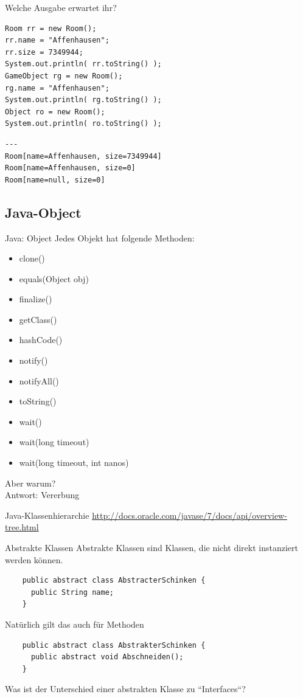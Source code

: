 \documentclass[18pt]{beamer}
\begin{document}
\begin{frame}[fragile]{Welche Ausgabe erwartet ihr?}
 \begin{lstlisting}
Room rr = new Room();
rr.name = "Affenhausen";
rr.size = 7349944;
System.out.println( rr.toString() );
GameObject rg = new Room();
rg.name = "Affenhausen";
System.out.println( rg.toString() );
Object ro = new Room();
System.out.println( ro.toString() );
 \end{lstlisting}
 \pause
 \begin{lstlisting}
---
Room[name=Affenhausen, size=7349944]
Room[name=Affenhausen, size=0]
Room[name=null, size=0]
\end{lstlisting}

\end{frame}

\subsection{Java-Object}
\begin{frame}{Java: Object}
  \small
 Jedes Objekt hat folgende Methoden:
 \begin{itemize}
  \item clone()
  \item equals(Object obj)
  \item finalize()
  \item getClass()
  \item hashCode()
  \item notify()
  \item notifyAll()
  \item toString()
  \item wait()
  \item wait(long timeout)
  \item wait(long timeout, int nanos)
 \end{itemize} \pause
 Aber warum? \pause \\
 \large Antwort: Vererbung
 

\end{frame}
\begin{frame}{Java-Klassenhierarchie}
 \url{http://docs.oracle.com/javase/7/docs/api/overview-tree.html}
\end{frame}

\begin{frame}[fragile]{Abstrakte Klassen}
 Abstrakte Klassen sind Klassen, die nicht direkt instanziert werden können.
 \begin{lstlisting}
    public abstract class AbstracterSchinken {
      public String name;
    }
 \end{lstlisting} \pause
 Natürlich gilt das auch für Methoden
 \begin{lstlisting}
    public abstract class AbstrakterSchinken {
      public abstract void Abschneiden();
    }
 \end{lstlisting} \pause
Was ist der Unterschied einer abstrakten Klasse zu ``Interfaces``?
\end{frame}
\end{document}
